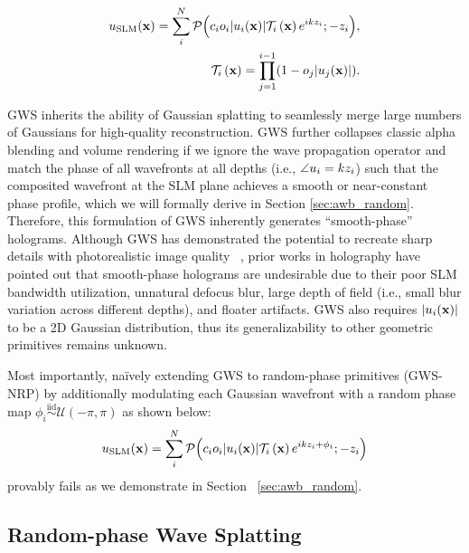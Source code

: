\begin{align}
    u_{\textrm{SLM}} (\mathbf{x}) = \sum_{i}^N \mathcal{P}\Big(c_i o_i |u_i(\mathbf{x})|\mathcal{T}_i\left(\mathbf{x}\right) e^{ikz_i}; -z_i\Big), \label{eq:gwsplat}\\
    \mathcal{T}_i\left(\mathbf{x}\right) = \prod_{j=1}^{i-1} (1 - o_{j} |u_j(\mathbf{x})|).
    \label{eq:gwsplat_T}
\end{align}

GWS inherits the ability of Gaussian splatting to seamlessly merge large numbers of Gaussians for high-quality reconstruction. GWS further collapses classic alpha blending and volume rendering \cite{kerbl3Dgaussians, kajiya1984ray} if we ignore the wave propagation operator and match the phase of all wavefronts at all depths (i.e., $\angle u_i=kz_i$) such that the composited wavefront at the SLM plane achieves a smooth or near-constant phase profile, which we will formally derive in Section \ref{sec:awb_random}. Therefore, this formulation of GWS inherently generates ``smooth-phase'' holograms. Although GWS has demonstrated the potential to recreate sharp details with photorealistic image quality ~\cite{choi2025gaussian}, prior works in holography \cite{schiffers2023stochastic, kim2022accommodative, shi2024ergonomic, lee2022binary} have pointed out that smooth-phase holograms are undesirable due to their poor SLM bandwidth utilization, unnatural defocus blur, large depth of field (i.e., small blur variation across different depths), and floater artifacts. GWS also requires $|u_i(\mathbf{x})|$ to be a 2D Gaussian distribution, thus its generalizability to other geometric primitives remains unknown.

Most importantly, na\"ively extending GWS to random-phase primitives (GWS-NRP) by additionally modulating each Gaussian wavefront with a random phase map $\phi_i \overset{\text{iid}}\sim \mathcal{U}(-\pi, \pi)$ as shown below:
\begin{align}
    u_{\textrm{SLM}} (\mathbf{x}) = \sum_{i}^N \mathcal{P}\Big(c_i o_i |u_i(\mathbf{x})|\mathcal{T}_i\left(\mathbf{x}\right) e^{ikz_i + \phi_i}; -z_i\Big)
    \label{eq:gwsplat_naive_random}
\end{align}
provably fails as we demonstrate in Section ~\ref{sec:awb_random}.

\subsection{Random-phase Wave Splatting}
\label{subsec:gws_rp}



